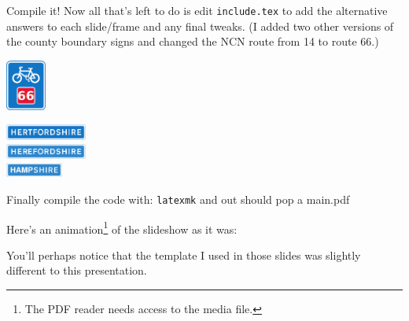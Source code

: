 \begin{frame}{Compile it!}
Now all that's left to do is edit {\tt include.tex} to add the alternative answers to each slide/frame and any final tweaks. (I added two other versions of the county boundary signs and changed the NCN route from 14 to route 66.)
\begin{center}
\parbox{0.1\textwidth}{
\raggedleft
\includegraphics[width=0.1\textwidth]{Motivation/Signs/extra/2602.2-66}
}
\parbox{0.2\textwidth}{%
\centering%
\includegraphics[width=0.2\textwidth]{Motivation/Signs/2928}\\
\includegraphics[width=0.2\textwidth]{Motivation/Signs/extra/2928b}\\
\includegraphics[width=0.14\textwidth]{Motivation/Signs/extra/2928c}
}
\end{center}

Finally compile the code with: {\tt latexmk} and out should pop a main.pdf
\end{frame}

{
\begin{frame}[label=quizslides]
\small
Here's an animation\footnote{The PDF reader needs access to the media file.} of the slideshow as it was:
\begin{center}
\end{center}
You'll perhaps notice that the template I used in those slides was slightly different to this presentation.
\end{frame}
}

